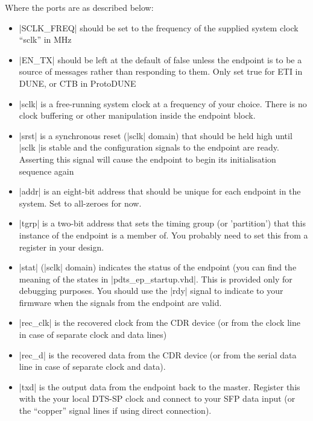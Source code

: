 \documentclass[a4paper,11pt]{article}
\begin{document}
Where the ports are as described below:

\begin{itemize}
    

\item |SCLK_FREQ| should be set to the frequency of the supplied system clock ``sclk'' in MHz

\item |EN_TX| should be left at the default of false unless the endpoint is to be a source of messages rather than responding to them. Only set true for ETI in DUNE, or CTB in ProtoDUNE

\item |sclk| is a free-running system clock at a frequency of your choice. There is no clock
buffering or other manipulation inside the endpoint block.

\item |srst| is a synchronous reset (|sclk| domain) that should be held high until |sclk |is stable
and the configuration signals to the endpoint are ready. Asserting this signal will cause
the endpoint to begin its initialisation sequence again

\item |addr| is an eight-bit address that should be unique for each endpoint in the system.
Set to all-zeroes for now.

\item |tgrp| is a two-bit address that sets the timing group (or 'partition') that this instance
of the endpoint is a member of. You probably need to set this from a register in your
design.

\item |stat| (|sclk| domain) indicates the status of the endpoint (you can find the meaning of the states
in |pdts_ep_startup.vhd|. This is provided only for debugging purposes. You should use the
|rdy| signal to indicate to your firmware when the signals from the endpoint are valid.

\item |rec_clk| is the recovered clock from the CDR device (or from the clock line in case of separate clock and data lines)

\item |rec_d| is the recovered data from the CDR device (or from the serial data line in case of separate clock and data).

\item |txd| is the output data from the endpoint back to the master. Register this with the your local DTS-SP clock and connect to your
SFP data input (or the ``copper'' signal lines if using direct connection).


\end{itemize}
\end{document}
